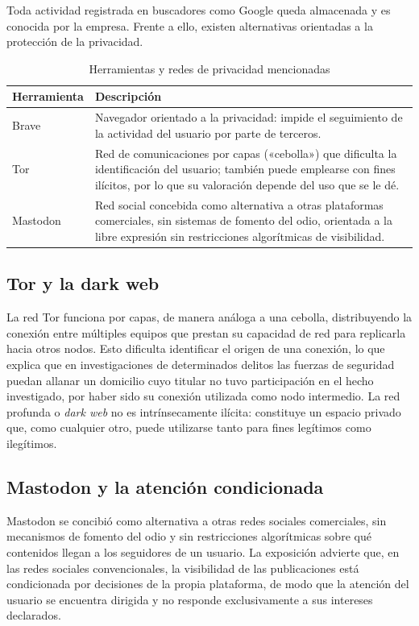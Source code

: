 \documentclass[12pt,oneside]{book}
\begin{document}
Toda actividad registrada en buscadores como Google queda almacenada y es conocida por la empresa. Frente a ello, existen alternativas orientadas a la protección de la privacidad.

\begin{table}[H]
\centering
\caption{Herramientas y redes de privacidad mencionadas}
\begin{tabular}{p{}p{}}
\toprule
\textbf{Herramienta} & \textbf{Descripción} \\
\midrule
Brave & Navegador orientado a la privacidad: impide el seguimiento de la actividad del usuario por parte de terceros. \\
Tor & Red de comunicaciones por capas («cebolla») que dificulta la identificación del usuario; también puede emplearse con fines ilícitos, por lo que su valoración depende del uso que se le dé. \\
Mastodon & Red social concebida como alternativa a otras plataformas comerciales, sin sistemas de fomento del odio, orientada a la libre expresión sin restricciones algorítmicas de visibilidad. \\
\bottomrule
\end{tabular}
\end{table}

\subsection{Tor y la dark web}

La red Tor funciona por capas, de manera análoga a una cebolla, distribuyendo la conexión entre múltiples equipos que prestan su capacidad de red para replicarla hacia otros nodos. Esto dificulta identificar el origen de una conexión, lo que explica que en investigaciones de determinados delitos las fuerzas de seguridad puedan allanar un domicilio cuyo titular no tuvo participación en el hecho investigado, por haber sido su conexión utilizada como nodo intermedio. La red profunda o \textit{dark web} no es intrínsecamente ilícita: constituye un espacio privado que, como cualquier otro, puede utilizarse tanto para fines legítimos como ilegítimos.

\subsection{Mastodon y la atención condicionada}

Mastodon se concibió como alternativa a otras redes sociales comerciales, sin mecanismos de fomento del odio y sin restricciones algorítmicas sobre qué contenidos llegan a los seguidores de un usuario. La exposición advierte que, en las redes sociales convencionales, la visibilidad de las publicaciones está condicionada por decisiones de la propia plataforma, de modo que la atención del usuario se encuentra dirigida y no responde exclusivamente a sus intereses declarados.
\end{document}
